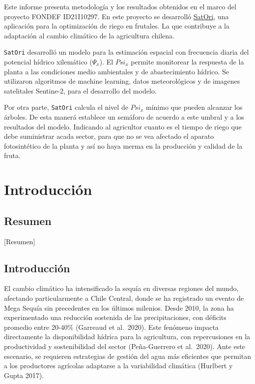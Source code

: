 \documentclass[
  letterpaper,
  DIV=11,
  numbers=noendperiod]{scrreprt}
\begin{document}

Este informe presenta metodología y los resultados obtenidos en el marco
del proyecto FONDEF ID21I10297. En este proyecto se desarrolló
\href{https://s4tori.cl}{SatOri}, una aplicación para la optimización de
riego en frutales. La que contribuye a la adaptación al cambio climático
de la agricultura chilena.

\texttt{SatOri} desarrolló un modelo para la estimación espacial con
frecuencia diaria del potencial hídrico xilemático (\(\Psi_x\)). El
\(Psi_x\) permite monitorear la respuesta de la planta a las condiciones
medio ambientales y de abastecimiento hídrico. Se utilizaron algoritmos
de machine learning, datos meteorológicos y de imagenes satelitales
Sentine-2, para el desarrollo del modelo.

Por otra parte, \texttt{SatOri} calcula el nivel de \(Psi_x\) mínimo que
pueden alcanzar los árboles. De esta manerá establece un semáforo de
acuerdo a este umbral y a los resultados del modelo. Indicando al
agricultor cuanto es el tiempo de riego que debe suministrar acada
sector, para que no se vea afectado el aparato fotosintético de la
planta y así no haya merma en la producción y calidad de la fruta.

\part{Introducción}

\chapter{Resumen}\label{resumen}

{[}Resumen{]}

\chapter{Introducción}\label{introducciuxf3n-1}

El cambio climático ha intensificado la sequía en diversas regiones del
mundo, afectando particularmente a Chile Central, donde se ha registrado
un evento de Mega Sequía sin precedentes en los últimos milenios. Desde
2010, la zona ha experimentado una reducción sostenida de las
precipitaciones, con déficits promedio entre 20-40\% (Garreaud et
al.~2020). Este fenómeno impacta directamente la disponibilidad hídrica
para la agricultura, con repercusiones en la productividad y
sostenibilidad del sector (Peña-Guerrero et al.~2020). Ante este
escenario, se requieren estrategias de gestión del agua más eficientes
que permitan a los productores agrícolas adaptarse a la variabilidad
climática (Hurlbert y Gupta 2017).
\end{document}
